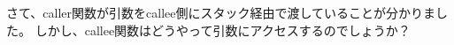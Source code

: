 \myindex{\Stack}

さて、\gls{caller}関数が引数を\gls{callee}側にスタック経由で渡していることが分かりました。
しかし、\gls{callee}関数はどうやって引数にアクセスするのでしょうか？








